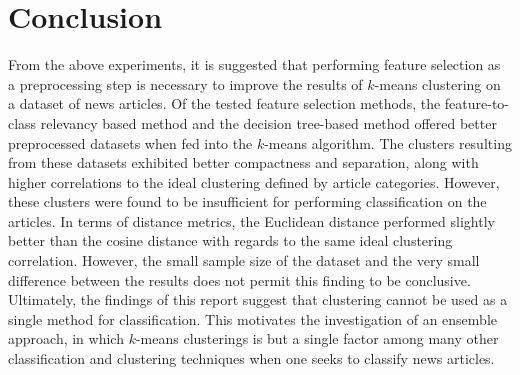 \documentclass[11pt]{article}
\begin{document}
\section{Conclusion} \label{sec:conclusion}

From the above experiments, it is suggested that performing feature selection as a preprocessing step is necessary to improve the results of $k$-means clustering on a dataset of news articles.
Of the tested feature selection methods, the feature-to-class relevancy based method and the decision tree-based method offered better preprocessed datasets when fed into the $k$-means algorithm.
The clusters resulting from these datasets exhibited better compactness and separation, along with higher correlations to the ideal clustering defined by article categories.
However, these clusters were found to be insufficient for performing classification on the articles.
In terms of distance metrics, the Euclidean distance performed slightly better than the cosine distance with regards to the same ideal clustering correlation.
However, the small sample size of the dataset and the very small difference between the results does not permit this finding to be conclusive.
Ultimately, the findings of this report suggest that clustering cannot be used as a single method for classification.
This motivates the investigation of an ensemble approach, in which $k$-means clusterings is but a single factor among many other classification and clustering techniques when one seeks to classify news articles.

{}

\end{document}
